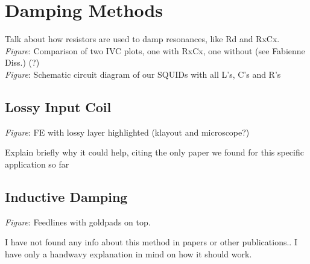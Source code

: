 \section{Damping Methods} \label{sec_damping}

Talk about how resistors are used to damp resonances, like Rd and RxCx.\\ 
\textit{Figure}: Comparison of two IVC plots, one with RxCx, one without (see Fabienne Diss.) (?) \\
\textit{Figure}: Schematic circuit diagram of our SQUIDs with all L's, C's and R's

\subsection{Lossy Input Coil}

\textit{Figure}: FE with lossy layer highlighted (klayout and microscope?)

Explain briefly why it could help, citing the only paper we found for this specific application so far

\subsection{Inductive Damping}

\textit{Figure}: Feedlines with goldpads on top.

I have not found any info about this method in papers or other publications.. I have only a handwavy explanation in mind on how it should work. 